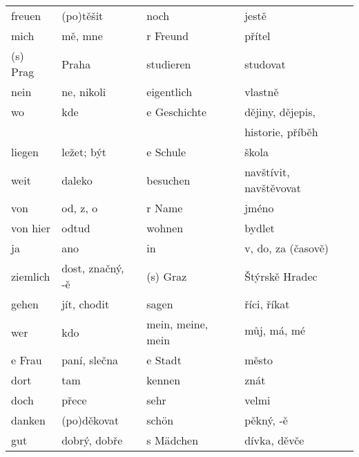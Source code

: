 \begin{widetext}
\begin{tabular}{llll}
      freuen      & (po)těšit         & noch              & jestě                             \\
      mich        & mě, mne           & r Freund          & přítel                            \\
      (s) Prag    & Praha             & studieren         & studovat                          \\
      nein        & ne, nikoli        & eigentlich        & vlastně                           \\
      wo          & kde               & e Geschichte      & dějiny, dějepis,                  \\
                  &                   &                   & historie, příběh                  \\
      liegen      & ležet; být        & e Schule          & škola                             \\
      weit        & daleko            & besuchen          & navštívit, navštěvovat            \\
      von         & od, z, o          & r Name            & jméno                             \\
      von hier    & odtud             & wohnen            & bydlet                            \\
      ja          & ano               & in                & v, do, za (časově)                \\
      ziemlich    & dost, značný, -ě  & (s) Graz          & Štýrskě Hradec                    \\
      gehen       & jít, chodit       & sagen             & říci, říkat                       \\
      wer         & kdo               & mein, meine, mein & můj, má, mé                      \\
      e Frau      & paní, slečna      & e Stadt           & město                             \\
      dort        & tam               & kennen            & znát                              \\
      doch        & přece             & sehr              & velmi                             \\
      danken      & (po)děkovat       & sch{\"o}n         & pěkný, -ě                         \\
      gut         & dobrý, dobře      & s M{\"a}dchen     & dívka, děvče \\
      \hline
    \end{tabular}
  \end{widetext}
  
